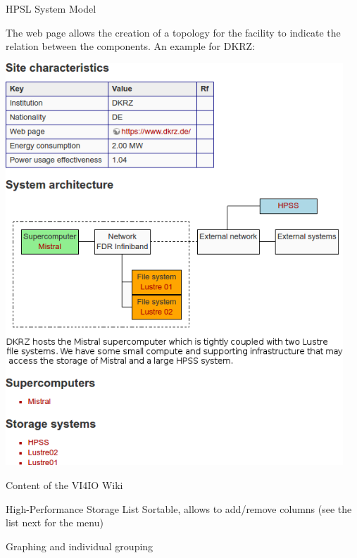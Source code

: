 \documentclass[portrait,a0paper,fontscale=0.4]{baposter}
\begin{document}
\begin{poster}
\begin{posterbox}[name=wps,column=0,above=bottom,below=overview]{HPSL System Model}
\vspace*{-5em}

The web page allows the creation of a topology for the facility to indicate the relation between the components.
An example for DKRZ:

\vspace*{-1em}

\begin{center}
\includegraphics[width=0.95\textwidth]{dkrz-site}
\end{center}

\end{posterbox}



\begin{posterbox}[name=concept,column=1,span=2]{Content of the VI4IO Wiki}


\end{posterbox}


\begin{posterbox}[name=schedule,column=1,span=2, below=concept]{High-Performance Storage List}
Sortable, allows to add/remove columns (see the list next for the menu)

Graphing and individual grouping 


\end{posterbox}
\end{poster}
\end{document}
